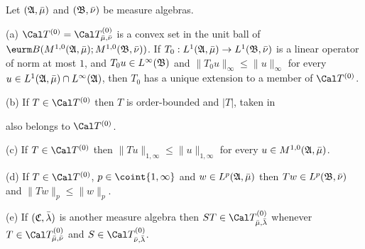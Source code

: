  Let $(\frak A,\bar\mu)$ and
$(\frak B,\bar\nu)$ be measure algebras.

(a) $\Cal T^{(0)}=\Cal T^{(0)}_{\bar\mu,\bar\nu}$
is a convex set in the unit ball of
$\eurm B(M^{1,0}(\frak A,\bar\mu);M^{1,0}(\frak B,\bar\nu))$.   If
$T_0:L^1(\frak A,\bar\mu)\to L^1(\frak B,\bar\nu)$ is a linear operator
of norm at most $1$, and $T_0u\in L^{\infty}(\frak B)$ and
$\|T_0u\|_{\infty}\le\|u\|_{\infty}$ for
every $u\in L^1(\frak A,\bar\mu)\cap L^{\infty}(\frak A)$, then $T_0$
has a unique extension to a member of $\Cal T^{(0)}$.

(b) If $T\in\Cal T^{(0)}$ then $T$ is order-bounded and $|T|$, taken in


\noindent also belongs to $\Cal T^{(0)}$.

(c) If $T\in\Cal T^{(0)}$ then $\|Tu\|_{1,\infty}\le\|u\|_{1,\infty}$
for every $u\in M^{1,0}(\frak A,\bar\mu)$.

(d) If $T\in\Cal T^{(0)}$, $p\in\coint{1,\infty}$ and
$w\in L^p(\frak A,\bar\mu)$ then
$Tw\in L^p(\frak B,\bar\nu)$ and $\|Tw\|_p\le\|w\|_p$.

(e) If $(\frak C,\bar\lambda)$ is another measure algebra then
$ST\in\Cal T^{(0)}_{\bar\mu,\bar\lambda}$ whenever
$T\in\Cal T^{(0)}_{\bar\mu,\bar\nu}$ and
$S\in\Cal T^{(0)}_{\bar\nu,\bar\lambda}$.

